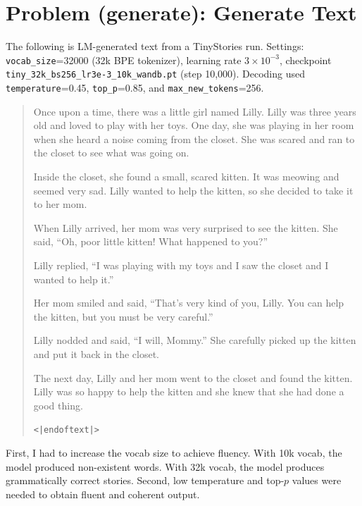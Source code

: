 \documentclass[11pt]{article}
\begin{document}
\section{Problem (generate): Generate Text}
The following is LM-generated text from a TinyStories run. Settings: \texttt{vocab\_size}=32000 (32k BPE tokenizer), learning rate \(3\times 10^{-3}\), checkpoint \texttt{tiny\_32k\_bs256\_lr3e-3\_10k\_wandb.pt} (step 10{,}000). Decoding used \texttt{temperature}=0.45, \texttt{top\_p}=0.85, and \texttt{max\_new\_tokens}=256.
\begin{quote}
Once upon a time, there was a little girl named Lilly. Lilly was three years old and loved to play with her toys. One day, she was playing in her room when she heard a noise coming from the closet. She was scared and ran to the closet to see what was going on.

Inside the closet, she found a small, scared kitten. It was meowing and seemed very sad. Lilly wanted to help the kitten, so she decided to take it to her mom.

When Lilly arrived, her mom was very surprised to see the kitten. She said, ``Oh, poor little kitten! What happened to you?''

Lilly replied, ``I was playing with my toys and I saw the closet and I wanted to help it.''

Her mom smiled and said, ``That's very kind of you, Lilly. You can help the kitten, but you must be very careful.''

Lilly nodded and said, ``I will, Mommy.'' She carefully picked up the kitten and put it back in the closet.

The next day, Lilly and her mom went to the closet and found the kitten. Lilly was so happy to help the kitten and she knew that she had done a good thing.

\texttt{<|endoftext|>}
\end{quote}

First, I had to increase the vocab size to achieve fluency. With 10k vocab, the model produced non-existent words. With 32k vocab, the model produces grammatically correct stories. Second, low temperature and top-$p$ values were needed to obtain fluent and coherent output.
\end{document}
